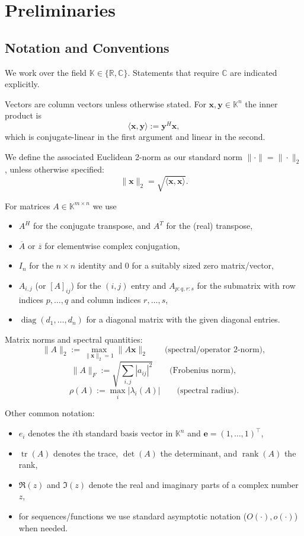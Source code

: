 \documentclass[../../main.tex]{subfiles}
\begin{document}
\chapter{Preliminaries}\label{chap:preliminaries}

\section{Notation and Conventions}
\label{sec:notation-conventions}

We work over the field $\mathbb{K}\in\{\mathbb{R},\mathbb{C}\}$. Statements that require $\mathbb{C}$ are indicated explicitly.

Vectors are column vectors unless otherwise stated. For $\mathbf{x},\mathbf{y}\in\mathbb{K}^n$ the inner product is
\[
    \langle \mathbf{x},\mathbf{y}\rangle := \mathbf{y}^H \mathbf{x},
\]
which is conjugate-linear in the first argument and linear in the second.

We define the associated Euclidean 2-norm as our standard norm $\|\cdot\| = \|\cdot\|_2$, unless otherwise specified:
\[
    \|\mathbf{x}\|_2=\sqrt{\langle\mathbf{x},\mathbf{x}\rangle}.
\]

For matrices $A\in\mathbb{K}^{m\times n}$ we use
\begin{itemize}
    \item $A^H$ for the conjugate transpose, and $A^T$ for the (real) transpose,
    \item $\overline{A}$ or $\overline{z}$ for elementwise complex conjugation,
    \item $I_n$ for the $n\times n$ identity and $0$ for a suitably sized zero matrix/vector,
    \item $A_{i,j}$ (or $[A]_{ij}$) for the $(i,j)$ entry and $A_{p:q,r:s}$ for the submatrix with row indices $p,\dots,q$ and column indices $r,\dots,s$,
    \item $\operatorname{diag}(d_1,\dots,d_n)$ for a diagonal matrix with the given diagonal entries.
\end{itemize}

Matrix norms and spectral quantities:
\[
    \|A\|_2 := \max_{\|\mathbf{x}\|_2=1}\|A\mathbf{x}\|_2 \qquad\text{(spectral/operator 2-norm)},
\]
\[
    \|A\|_F := \sqrt{\sum_{i,j}|a_{ij}|^2}\qquad\text{(Frobenius norm)},
\]
\[
    \rho(A) := \max_i |\lambda_i(A)|\qquad\text{(spectral radius)}.
\]

Other common notation:
\begin{itemize}
    \item $e_i$ denotes the $i$th standard basis vector in $\mathbb{K}^n$ and $\mathbf{e}=(1,\dots,1)^\top$,
    \item $\operatorname{tr}(A)$ denotes the trace, $\det(A)$ the determinant, and $\operatorname{rank}(A)$ the rank,
    \item $\Re(z)$ and $\Im(z)$ denote the real and imaginary parts of a complex number $z$,
    \item for sequences/functions we use standard asymptotic notation ($O(\cdot), o(\cdot)$) when needed.
\end{itemize}
\end{document}
